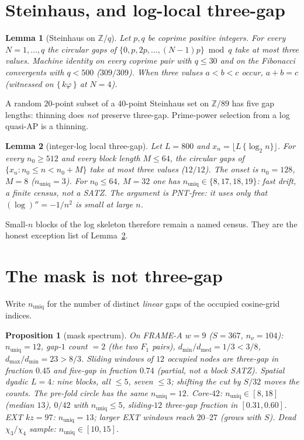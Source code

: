 \documentclass[11pt]{article}
\newtheorem{lemma}{Lemma}
\newtheorem{prop}{Proposition}
\theoremstyle{remark}
\newcommand{\Z}{\mathbb{Z}}
\begin{document}
\section{Steinhaus, and log-local three-gap}\label{sec:satz}

\begin{lemma}[Steinhaus on $\Z/q$]\label{lem:steinhaus}
Let $p,q$ be coprime positive integers.  For every
$N=1,\ldots,q$ the circular gaps of
$\{0,p,2p,\ldots,(N-1)p\}\bmod q$ take at most three values.
Machine identity on every coprime pair with $q\le 30$ and on
the Fibonacci convergents with $q<500$ ($309/309$).
When three values $a<b<c$ occur, $a+b=c$
(witnessed on $\{\,k\varphi\,\}$ at $N=4$).
\end{lemma}

A random $20$-point subset of a $40$-point Steinhaus set on
$\Z/89$ has five gap lengths: thinning does \emph{not}
preserve three-gap.  Prime-power selection from a log
quasi-AP is a thinning.

\begin{lemma}[integer-log local three-gap]\label{lem:loglocal}
Let $L=800$ and $x_n=\bigl\lfloor L\,\{\log_2 n\}\bigr\rfloor$.
For every $n_0\ge 512$ and every block length $M\le 64$, the
circular gaps of $\{x_n:n_0\le n<n_0+M\}$ take at most three
values ($12/12$).  The onset is $n_0=128$, $M=8$
($n_{\mathrm{uniq}}=3$).
For $n_0\le 64$, $M=32$ one has $n_{\mathrm{uniq}}\in\{8,17,18,19\}$:
fast drift, a finite census, not a SATZ.
The argument is PNT-free: it uses only that $(\log)''=-1/n^2$
is small at large $n$.
\end{lemma}

Small-$n$ blocks of the log skeleton therefore remain a
named census.  They are the honest exception list of
Lemma~\ref{lem:loglocal}.

\section{The mask is not three-gap}\label{sec:mask}

Write $n_{\mathrm{uniq}}$ for the number of distinct
\emph{linear} gaps of the occupied cosine-grid indices.

\begin{prop}[mask spectrum]\label{prop:mask}
On FRAME-A $w=9$ ($S=367$, $n_\nu=104$):
$n_{\mathrm{uniq}}=12$, gap-$1$ count $=2$ (the two $F_1$
pairs), $d_{\min}/d_{\mathrm{med}}=1/3<3/8$,
$d_{\max}/d_{\min}=23>8/3$.
Sliding windows of $12$ occupied nodes are three-gap in
fraction $0.45$ and five-gap in fraction $0.74$ (partial, not
a block SATZ).  Spatial dyadic $L=4$: nine blocks, all
$\le 5$, seven $\le 3$; shifting the cut by $S/32$ moves the
counts.  The pre-fold circle has the same
$n_{\mathrm{uniq}}=12$.
Core-$42$: $n_{\mathrm{uniq}}\in[8,18]$ (median $13$),
$0/42$ with $n_{\mathrm{uniq}}\le 5$, sliding-$12$
three-gap fraction in $[0.31,0.60]$.
EXT $kz=97$: $n_{\mathrm{uniq}}=13$; larger EXT windows
reach $20$--$27$ (grows with $S$).
Dead $\chi_3/\chi_4$ sample: $n_{\mathrm{uniq}}\in[10,15]$.
\end{prop}
\end{document}
